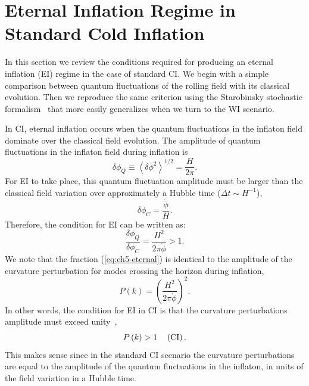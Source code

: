 \section{Eternal Inflation Regime in Standard Cold Inflation }
\label{sec:ch5-EICI}

In this section we review the conditions required for producing an eternal inflation (EI) regime in the case of standard CI. We begin with a simple comparison between quantum fluctuations of the rolling field with its classical evolution. Then we reproduce the same criterion using the Starobinsky stochastic formalism~\cite{Starobinsky:1986fx} that more easily generalizes when we turn to the WI scenario.

In CI, eternal inflation occurs when the quantum fluctuations in the inflaton field dominate over the classical field evolution.  The amplitude of quantum fluctuations in the inflaton field during inflation is
\begin{equation}
\delta\phi_Q \equiv \left\langle \delta \phi^2\right\rangle^{1/2} = \frac{H}{2 \pi}.
\end{equation}
For EI to take place, this quantum fluctuation amplitude must be larger than the classical field variation over approximately a Hubble time ($\Delta t\sim
H^{-1}$),
\begin{equation}
\delta\phi_C = \frac{\dot\phi}{H}.
\end{equation}
Therefore, the condition for EI can be written as:
\begin{equation}
\frac{\delta\phi_Q}{\delta\phi_C} = \frac{H^2}{2 \pi \dot\phi} > 1.\label{eq:ch5-eternal}
\end{equation}
We note that the fraction (\ref{eq:ch5-eternal}) is identical to the amplitude of the curvature perturbation for modes crossing the horizon during inflation,
\begin{equation}
P\left(k\right) =\left(\frac{H^2}{2\pi\dot{\phi}}\right)^2. \label{eq:ch5-DeltaR2_CI}
\end{equation}
In other words, the condition for EI in CI is that the curvature perturbations amplitude must
exceed unity~\cite{Goncharov:1987ir,Guth:2007ng,Kinney:2014jya},
\begin{equation}
\label{eq:ch5-FDR_CI}
P\left(k\right) > 1 \,\,\,\,\,\,\,   ({\rm
 CI}) \, .
\end{equation}
This makes sense since in the standard CI scenario the
curvature perturbations are equal to the amplitude of the quantum fluctuations in the inflaton,
in units of the field variation in a Hubble time.


